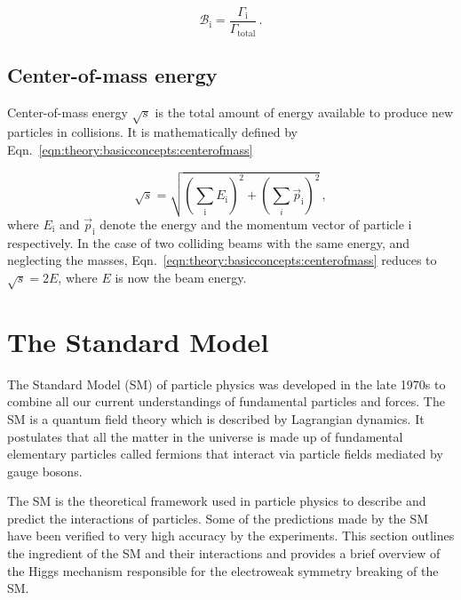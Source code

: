 \begin{equation} \label{eqn:theory:basicconcepts:branchingfraction}
\mathcal{B}_{\text{i}} = \frac{\Gamma_{\text{i}}}{\Gamma_{\text{total}}} \,.
\end{equation}


\subsection*{Center-of-mass energy}%
\label{sec:theory:basicconcepts:centerofmass}
Center-of-mass energy $\sqrt{s}$ is the total amount of energy available to produce new particles in collisions. It is mathematically defined by Eqn.\ \ref{eqn:theory:basicconcepts:centerofmass}

\begin{equation}
\sqrt{s} = \sqrt{\left(\sum_{\text{i}}E_{\text{i}}\right)^{\text{2}} + \left(\sum_{i}\vec{p}_{\text{i}}\right)^{\text{2}}} \,,
\label{eqn:theory:basicconcepts:centerofmass}
\end{equation}
where $E_{\text{i}}$ and $\vec{p}_{\text{i}}$ denote the energy and the momentum vector of particle i respectively. In the case of two colliding beams with the same energy, and neglecting the masses, Eqn.\ \ref{eqn:theory:basicconcepts:centerofmass} reduces to $\sqrt{s} = 2E$, where $E$ is now the beam energy.~\cite{thesis:chris}  


\section{The Standard Model}%
\label{sec:theory:standardmodel}
The Standard Model (SM) of particle physics was developed in the late 1970s to combine all our current understandings of fundamental particles and forces. The SM is a quantum field theory which is described by Lagrangian dynamics. It postulates that all the matter in the universe is made up of fundamental elementary particles called fermions that interact via particle fields mediated by gauge bosons.~\cite{thomson} 

The SM is the theoretical framework used in particle physics to describe and predict the interactions of particles. Some of the predictions made by the SM have been verified to very high accuracy by the experiments. This section outlines the ingredient of the SM and their interactions and provides a brief overview of the Higgs mechanism responsible for the electroweak symmetry breaking of the SM.

